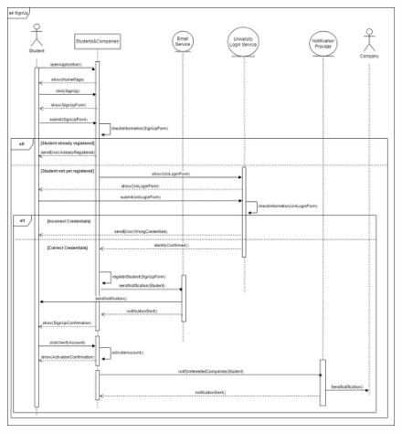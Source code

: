 \documentclass{article}
\begin{document}
\begin{figure}[H]
    \hspace*{-2cm} %
    \includegraphics[scale = 0.45]{figures/UseCasesSD/StudentSignUpSD.drawio (3).png}\\
\end{figure}
\end{document}
